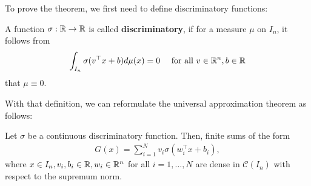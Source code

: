 To prove the theorem, we first need to define discriminatory functions: 
\begin{definition}
	A function $\sigma: \mathbb{R} \to \mathbb{R}$ is called \textbf{discriminatory}, if for a measure $\mu$ on $I_n$, it follows from
	$$
	\int_{I_n} \sigma(v^{\top}x + b) d\mu(x) = 0 \quad \text{ for all } v\in\mathbb{R}^n, b \in \mathbb{R}
	$$
	that $\mu \equiv 0$.
\end{definition}

With that definition, we can reformulate the universal approximation theorem as follows:

\begin{theorem}\label{UAT-reformulated}
	Let $\sigma$ be a continuous discriminatory function. Then, finite sums of the form
	\begin{equation}\label{form-of-G-2}
	\begin{split}
		G(x) = \sum_{i=1}^{N} v_i \sigma(w_i^{\top}x + b_i), 
	\end{split}
	\end{equation}
	where $x\in I_n, v_i, b_i \in \mathbb{R}, w_i \in \mathbb{R}^n$ for all $i=1,\dots, N$ are dense in $\mathcal{C}(I_n)$ with respect to the supremum norm. 
\end{theorem}
